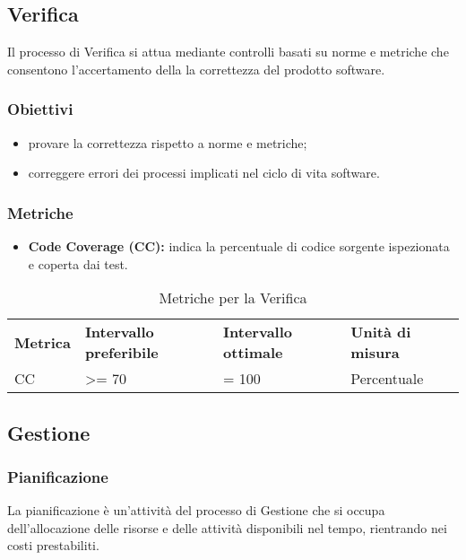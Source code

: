 \subsection{Verifica}
Il processo di Verifica si attua mediante controlli basati su norme e metriche che consentono l'accertamento della la correttezza del prodotto software.
\subsubsection{Obiettivi}
\begin{itemize}
	\item provare la correttezza rispetto a norme e metriche;
	\item correggere errori dei processi implicati nel ciclo di vita software.
\end{itemize}
\subsubsection{Metriche}
\begin{itemize}
	\item \textbf{Code Coverage (CC):} indica la percentuale di codice sorgente ispezionata e coperta dai test.
\end{itemize}

\renewcommand{\arraystretch}{2.2}
\begin{longtable}{|C{2.5cm}|C{3.25cm}|C{3.25cm}|C{3cm}|}
	
	\caption{Metriche per la Verifica}\\
	\hline
	
	\textbf{Metrica} & \textbf{Intervallo preferibile}  & \textbf{Intervallo ottimale} & \textbf{Unità di misura}
	\tabularnewline
	\endfirsthead
	
	CC & >= 70  & = 100 & Percentuale \\ 
	
\end{longtable}


\subsection{Gestione}
\subsubsection{Pianificazione}
La pianificazione è un'attività del processo di Gestione che si occupa dell'allocazione delle risorse e delle attività disponibili nel tempo, rientrando nei costi prestabiliti.

